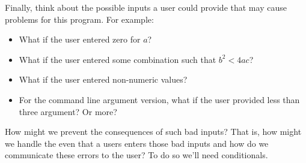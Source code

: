Finally, think about the possible inputs a user could provide that may cause problems
for this program.  For example:
\begin{itemize}
  \item What if the user entered zero for $a$?
  \item What if the user entered some combination such that $b^2 < 4ac$?
  \item What if the user entered non-numeric values?
  \item For the command line argument version, what if the user provided less than
  	three argument?  Or more?
\end{itemize}
How might we prevent the consequences of such bad inputs?  That is, 
how might we handle the even that a users enters those bad inputs and
how do we communicate these errors to the user?  To do so we'll need 
conditionals.

